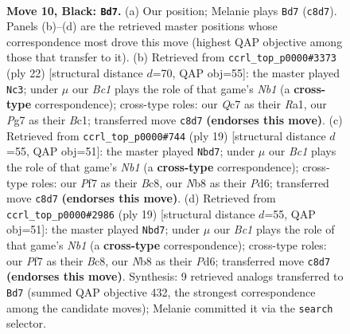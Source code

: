 \documentclass[11pt]{article}
\begin{document}
\clearpage

\begin{figure}[p]\centering
\begin{subfigure}{0.46\textwidth}\centering
\resizebox{\linewidth}{!}{%
\newchessgame
\chessboard[
  setfen={rnbb1rk1/ppq2ppp/4pn2/2Pp4/3P4/2N2N2/PP1BBPPP/R2Q1RK1 b - - 6 10},
  showmover=false,
  pgfstyle=straightmove, color=movearrow, markmove={c8-d7}
]}
\caption{}
\end{subfigure}\hfill
\begin{subfigure}{0.46\textwidth}\centering
\resizebox{\linewidth}{!}{%
\newchessgame
\chessboard[
  setfen={r2q1rk1/2pbbppp/p1n1pn2/1p6/3P4/1P2PNP1/4QPBP/RNBR2K1 w - - 3 12},
  showmover=false,
  pgfstyle=straightmove, color=movearrow, markmove={b1-c3}
]}
\caption{}
\end{subfigure}
\\[4pt]
\begin{subfigure}{0.46\textwidth}\centering
\resizebox{\linewidth}{!}{%
\newchessgame
\chessboard[
  setfen={rnb2rk1/1pq1bppp/p2ppn2/P7/3NP3/2N1B3/1PP1BPPP/R2Q1RK1 b - - 2 10},
  showmover=false,
  pgfstyle=straightmove, color=movearrow, markmove={b8-d7}
]}
\caption{}
\end{subfigure}\hfill
\begin{subfigure}{0.46\textwidth}\centering
\resizebox{\linewidth}{!}{%
\newchessgame
\chessboard[
  setfen={rnb2rk1/1pq1bppp/p2ppn2/P7/3NP3/2N1B3/1PP1BPPP/R2Q1RK1 b - - 2 10},
  showmover=false,
  pgfstyle=straightmove, color=movearrow, markmove={b8-d7}
]}
\caption{}
\end{subfigure}
\caption{\textbf{Move 10, Black: \texttt{Bd7}.} (a) Our position; Melanie plays \texttt{Bd7} (\texttt{c8d7}). Panels (b)--(d) are the retrieved master positions whose correspondence most drove this move (highest QAP objective among those that transfer to it). (b) Retrieved from \texttt{ccrl\_top\_p0000\#3373} (ply 22) [structural distance $d$=70, QAP obj=55]: the master played \texttt{Nc3}; under $\mu$ our \emph{Bc1} plays the role of that game's \emph{Nb1} (a \textbf{cross-type} correspondence); cross-type roles: our \emph{Q}c7 as their \emph{R}a1, our \emph{P}g7 as their \emph{B}c1; transferred move \texttt{c8d7} \textbf{(endorses this move)}. (c) Retrieved from \texttt{ccrl\_top\_p0000\#744} (ply 19) [structural distance $d$=55, QAP obj=51]: the master played \texttt{Nbd7}; under $\mu$ our \emph{Bc1} plays the role of that game's \emph{Nb1} (a \textbf{cross-type} correspondence); cross-type roles: our \emph{P}f7 as their \emph{B}c8, our \emph{N}b8 as their \emph{P}d6; transferred move \texttt{c8d7} \textbf{(endorses this move)}. (d) Retrieved from \texttt{ccrl\_top\_p0000\#2986} (ply 19) [structural distance $d$=55, QAP obj=51]: the master played \texttt{Nbd7}; under $\mu$ our \emph{Bc1} plays the role of that game's \emph{Nb1} (a \textbf{cross-type} correspondence); cross-type roles: our \emph{P}f7 as their \emph{B}c8, our \emph{N}b8 as their \emph{P}d6; transferred move \texttt{c8d7} \textbf{(endorses this move)}. Synthesis: 9 retrieved analogs transferred to \texttt{Bd7} (summed QAP objective 432, the strongest correspondence among the candidate moves); Melanie committed it via the \texttt{search} selector.}
\label{fig:thought-m19}
\end{figure}
\end{document}
